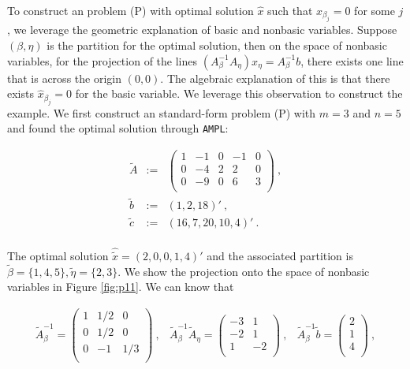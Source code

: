 To construct an problem (P) with optimal solution $\hat{x}$ such that $\hat{x}_{\beta_j} = 0$ for some $j$, we leverage the geometric explanation of basic and nonbasic variables. Suppose $(\beta, \eta)$ is the partition for the optimal solution, then on the space of nonbasic variables, for the projection of the lines $\left(A_\beta^{-1}A_\eta\right)x_\eta = A_\beta^{-1}b$, there exists one line that is across the origin $(0,0)$. The algebraic explanation of this is that there exists $\hat{x}_{\beta_j} = 0$ for the basic variable. We leverage this observation to construct the example. We first construct an standard-form problem (P) with $m=3$ and $n=5$ and found the optimal solution through {\tt AMPL}:

\[
\begin{array}{ccl}
\tilde{A} & := & \left(
  \begin{array}{ccccc}
    1 & -1 & 0 & -1 & 0  \\
    0 & -4 & 2 & 2 & 0 \\
    0 & -9 & 0 & 6 & 3\\
  \end{array}
\right)~, \\
\tilde{b} & := & (1,2,18)'~,\\
\tilde{c} & := & (16, 7, 20, 10, 4)'~.\\

\end{array}
\]

The optimal solution $\hat{\tilde{x}} = (2,0,0,1,4)'$ and the associated partition is $\tilde{\beta} = \{1,4,5\}, \tilde{\eta}= \{2,3\}$. We show the projection onto the space of nonbasic variables in Figure \ref{fig:p11}. We can know that 

\[
\begin{array}{ccc}
\tilde{A}_\beta^{-1}  =  \left(
  \begin{array}{ccc}
    1 & 1/2 & 0   \\
    0 & 1/2 & 0 \\
    0 & -1 & 1/3\\
  \end{array}
\right)~, &

\tilde{A}_\beta^{-1}\tilde{A}_\eta  =  \left(
  \begin{array}{cc}
    -3 & 1   \\
    -2 & 1 \\
    1 & -2\\
  \end{array}
\right)~,&

\tilde{A}_\beta^{-1}\tilde{b}  =  \left(
  \begin{array}{c}
    2   \\
    1 \\
    4\\
  \end{array}
\right)~,

\end{array}
\]

